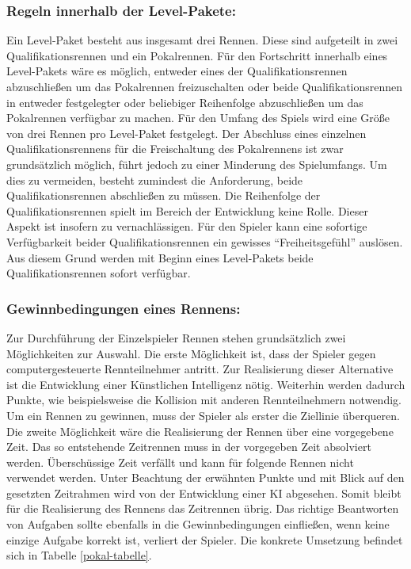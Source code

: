 	\subsubsection*{Regeln innerhalb der Level-Pakete:}
		Ein Level-Paket besteht aus insgesamt drei Rennen. Diese sind aufgeteilt in zwei Qualifikationsrennen und ein Pokalrennen. Für den Fortschritt innerhalb eines Level-Pakets wäre es möglich, entweder eines der Qualifikationsrennen abzuschließen um das Pokalrennen freizuschalten oder beide Qualifikationsrennen in entweder festgelegter oder beliebiger Reihenfolge abzuschließen um das Pokalrennen verfügbar zu machen.
		Für den Umfang des Spiels wird eine Größe von drei Rennen pro Level-Paket festgelegt. Der Abschluss eines einzelnen Qualifikationsrennens für die Freischaltung des Pokalrennens ist zwar grundsätzlich möglich, führt jedoch zu einer Minderung des Spielumfangs. Um dies zu vermeiden, besteht zumindest die Anforderung, beide Qualifikationsrennen abschließen zu müssen. Die Reihenfolge der Qualifikationsrennen spielt im Bereich der Entwicklung keine Rolle. Dieser Aspekt ist insofern zu vernachlässigen. Für den Spieler kann eine sofortige Verfügbarkeit beider Qualifikationsrennen ein gewisses \enquote{Freiheitsgefühl} auslösen. Aus diesem Grund werden mit Beginn eines Level-Pakets beide Qualifikationsrennen sofort verfügbar.

	\subsubsection*{Gewinnbedingungen eines Rennens:}\label{gewinnbedinungen}
		Zur Durchführung der Einzelspieler Rennen stehen grundsätzlich zwei Möglichkeiten zur Auswahl. Die erste Möglichkeit ist, dass der Spieler gegen computergesteuerte Rennteilnehmer antritt. Zur Realisierung dieser Alternative ist die Entwicklung einer Künstlichen Intelligenz nötig. Weiterhin werden dadurch Punkte, wie beispielsweise die Kollision mit anderen Rennteilnehmern notwendig. Um ein Rennen zu gewinnen, muss der Spieler als erster die Ziellinie überqueren.
		Die zweite Möglichkeit wäre die Realisierung der Rennen über eine vorgegebene Zeit. Das so entstehende Zeitrennen muss in der vorgegeben Zeit absolviert werden. Überschüssige Zeit verfällt und kann für folgende Rennen nicht verwendet werden.
		Unter Beachtung der erwähnten Punkte und mit Blick auf den gesetzten Zeitrahmen wird von der Entwicklung einer KI abgesehen. Somit bleibt für die Realisierung des Rennens das Zeitrennen übrig.
		Das richtige Beantworten von Aufgaben sollte ebenfalls in die Gewinnbedingungen einfließen, wenn keine einzige Aufgabe korrekt ist, verliert der Spieler. Die konkrete Umsetzung befindet sich in Tabelle \ref{pokal-tabelle}.

